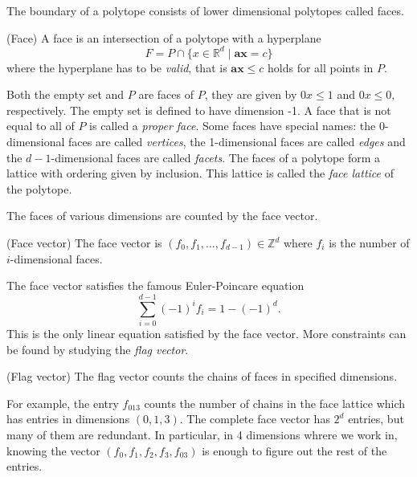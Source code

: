  The boundary 
of a polytope consists of lower dimensional polytopes called faces. 
\begin{definition}
 (Face) A face is an intersection of a polytope with a hyperplane 
\begin{equation}
 F = P \cap \{x \in \mathbb{R}^d \mid \mathbf{a}\mathbf{x} = c\}
\end{equation}
where the hyperplane has to be \textit{valid}, that is $\mathbf{a}\mathbf{x} 
\leq c$ holds for all points in $P$. 

\end{definition}
Both the empty set and $P$ are faces of $P$, they are given by $0x \le 1$ and $0x \le 0$, respectively.
The empty set is defined to have dimension -1.
A face that is not equal to all of $P$ is called a \textit{proper face}.
Some faces have special names: the 0-dimensional faces are called 
\textit{vertices}, the 1-dimensional faces are called \textit{edges} and the 
$d-1$-dimensional faces are called \textit{facets}.
 The faces of a polytope 
form a lattice with ordering given by inclusion. This lattice is called the 
\textit{face lattice} of the polytope.

The faces of various dimensions 
are counted by the face vector.
\begin{definition}
 (Face vector) The face vector is $(f_0, f_1, \dots, f_{d-1}) \in \mathbb{Z}^d$ 
where $f_i$ is 
the number of $i$-dimensional faces.
\end{definition}
The face vector satisfies the famous Euler-Poincare equation
\begin{equation}
 \sum_{i=0}^{d-1} (-1)^i f_i = 1 - (-1)^d.
\end{equation}
This is the only linear equation satisfied by the face vector. More 
constraints can be found by studying the \textit{flag vector}.

\begin{definition}
 (Flag vector) The flag vector counts the chains of faces in specified 
dimensions.
\end{definition}

For example, the entry $f_{013}$ counts the number of chains in the face 
lattice which has entries in dimensions $(0,1,3)$. The complete face vector has $2^d$ entries,
but many of them are redundant. In particular, in 4 dimensions whrere we work in,
knowing the vector $(f_0, f_1, f_2, f_3, f_{03})$ is enough to figure out the rest of the entries. 

